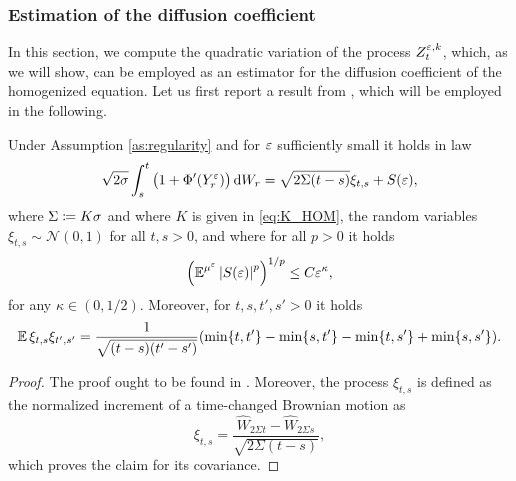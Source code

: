 \documentclass[10pt]{article}
\begin{document}
\subsubsection{Estimation of the diffusion coefficient}

In this section, we compute the quadratic variation of the process $Z_t^{\varepsilon, k}$, which, as we will show, can be employed as an estimator for the diffusion coefficient of the homogenized equation. Let us first report a result from \cite{PaS07}, which will be employed in the following.
\begin{lemma}\label{lem:Sigma} Under Assumption \ref{as:regularity} and for $\varepsilon$ sufficiently small it holds in law
	\begin{equation}
		\sqrt{2\sigma}\int_s^t \big(1 + \Phi'(Y^\varepsilon_r)\big) \,\mathrm{d} W_r = \sqrt{2\Sigma(t-s)} \xi_{t,s} + S(\varepsilon),
	\end{equation}
	where $\Sigma \coloneqq K \sigma$ and where $K$ is given in \eqref{eq:K_HOM}, the random variables $\xi_{t,s} \sim \mathcal N(0, 1)$ for all $t, s > 0$, and where for all $p > 0$ it holds
	\begin{equation}
		\left(\operatorname{\mathbb{E}}^{\mu^\varepsilon}\left\lvert S(\varepsilon)\right\rvert^p\right)^{1/p} \leq C \varepsilon^\kappa,
	\end{equation}
	for any $\kappa \in (0, 1/2)$. Moreover, for $t, s, t', s' > 0$ it holds
	\begin{equation}
		\operatorname{\mathbb{E}} \xi_{t,s} \xi_{t',s'} = \frac1{\sqrt{(t-s)(t'-s')}} (\min\{t, t'\} - \min\{s, t'\} - \min\{t,s'\} + \min\{s,s'\}).
	\end{equation}
\end{lemma}
\begin{proof} The proof ought to be found in \cite[Proposition 5.8]{PaS07}. Moreover, the process $\xi_{t,s}$ is defined as the normalized increment of a time-changed Brownian motion as
	\begin{equation}
		\xi_{t,s} = \frac{\widehat W_{2\Sigma t} - \widehat W_{2\Sigma s}}{\sqrt{2\Sigma (t-s)}}, 
	\end{equation}
	which proves the claim for its covariance.
\end{proof}
\end{document}
